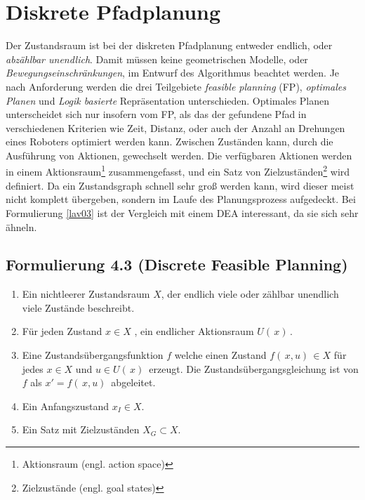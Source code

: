 \section{Diskrete Pfadplanung} \label{Kapitel 4.3} 
Der Zustandsraum ist bei der diskreten Pfadplanung entweder endlich, oder \textit{abzählbar unendlich}.
Damit müssen keine geometrischen Modelle, oder \textit{Bewegungseinschränkungen},  im Entwurf des Algorithmus beachtet werden.
Je nach Anforderung werden die drei Teilgebiete \textit{feasible planning} (FP), \textit{optimales Planen} und \textit{Logik basierte} Repräsentation unterschieden\cite[~S. 27]{Lav06}.
Optimales Planen unterscheidet sich nur insofern vom FP, als das der gefundene Pfad in verschiedenen Kriterien wie Zeit, Distanz, oder auch der Anzahl an Drehungen eines Roboters optimiert werden kann\cite[~S. 43]{Lav06}.
Zwischen Zuständen kann, durch die Ausführung von Aktionen, gewechselt werden. Die verfügbaren Aktionen werden in einem Aktionsraum\footnote{Aktionsraum (engl. action space) } zusammengefasst, und ein Satz von Zielzuständen\footnote{Zielzustände (engl. goal states)} wird definiert. 
Da ein Zustandsgraph schnell sehr groß werden kann, wird dieser meist nicht komplett übergeben, sondern im Laufe des Planungsprozess aufgedeckt\cite[~S. 43]{Lav06}. 
Bei Formulierung \ref{lav03} ist der Vergleich mit einem DEA interessant, da sie sich sehr ähneln\cite[~S. 233]{Schmitz:19}.

\subsection*{Formulierung 4.3 (Discrete Feasible Planning)\cite[~S. 29]{Lav06}}
\begin{enumerate}
	\item Ein nichtleerer Zustandsraum $X$, der endlich viele oder zählbar unendlich viele Zustände beschreibt.  
	\item Für jeden Zustand $x \in X$ , ein endlicher Aktionsraum $U( \, x) \,$.
	\item Eine Zustandsübergangsfunktion $f$ welche einen Zustand  $f( \, x,u) \, \in X$ für jedes $x \in X$  und $u \in U( \, x) \,$ erzeugt. Die Zustandsübergangsgleichung ist von $f$ als $x' = f( \, x,u )\, $ abgeleitet.
	\item Ein Anfangszustand $ x_{I} \in X$.
	\item Ein Satz mit Zielzuständen $X_{G} \subset X$.
\end{enumerate}

